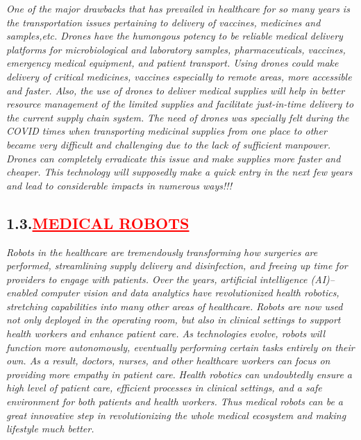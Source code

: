 \documentclass[12pt]{article}
\begin{document}
\hspace{1cm}\large{\emph{One of the major drawbacks that has prevailed in healthcare for so many years is the transportation issues pertaining to delivery of vaccines, medicines and samples,etc. Drones have the humongous potency to be reliable medical delivery platforms for microbiological and laboratory samples, pharmaceuticals, vaccines, emergency medical equipment, and patient transport. Using drones could make delivery of critical medicines, vaccines especially to remote areas, more accessible and faster. Also, the use of drones to deliver medical supplies will help in better resource management of the limited supplies and facilitate just-in-time delivery to the current supply chain system.}}\vspace{1cm}\newline
\hspace{1cm}\large{\emph{The need of drones was specially felt during the COVID times when transporting medicinal supplies from one place to other became very difficult and challenging due to the lack of sufficient manpower. Drones can completely erradicate this issue and make supplies more faster and cheaper. This technology will supposedly make a quick entry in the next few years and lead to considerable impacts in numerous ways!!!}}
\vspace{1cm}
\subsection*{\textbf{\hspace{1cm}1.3.\hspace{1cm}\textcolor{red}{\underline{\Large{MEDICAL ROBOTS}}}}}

\hspace{1cm}\large{\emph{Robots in the healthcare are tremendously transforming how surgeries are performed, streamlining supply delivery and disinfection, and freeing up time for providers to engage with patients. Over the years, artificial intelligence (AI)–enabled computer vision and data analytics have revolutionized health robotics, stretching capabilities into many other areas of healthcare. Robots are now used not only deployed in the operating room, but also in clinical settings to support health workers and enhance patient care. As technologies evolve, robots will function more autonomously, eventually performing certain tasks entirely on their own. As a result, doctors, nurses, and other healthcare workers can focus on providing more empathy in patient care.}}\vspace{1cm}\newline
\hspace{1cm}\large{\emph{Health robotics can undoubtedly ensure a high level of patient care, efficient processes in clinical settings, and a safe environment for both patients and health workers. Thus medical robots can be a great innovative step in revolutionizing the whole medical ecosystem and making lifestyle much better.}}
\end{document}

